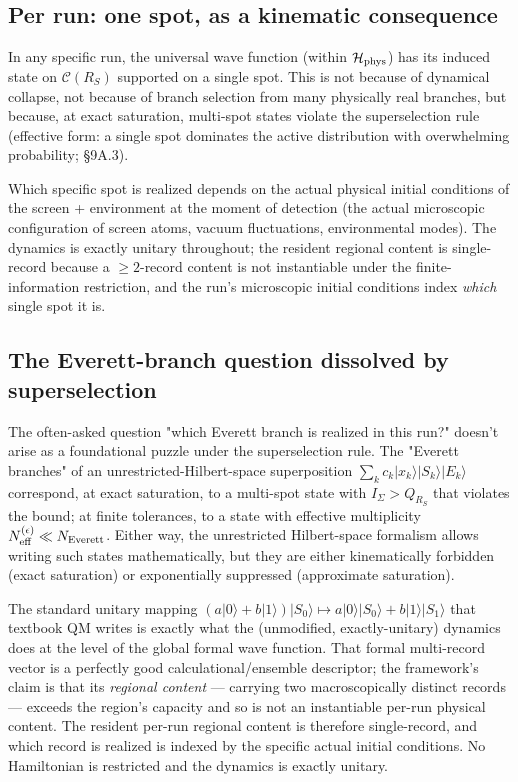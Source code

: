 \documentclass[11pt,a4paper]{article}
\begin{document}
\subsection{Per run: one spot, as a kinematic consequence}

In any specific run, the universal wave function (within $\mathcal{H}_{\rm phys}$) has its induced state on $\mathcal{C}(R_S)$ supported on a single spot. This is not because of dynamical collapse, not because of branch selection from many physically real branches, but because, at exact saturation, multi-spot states violate the superselection rule (effective form: a single spot dominates the active distribution with overwhelming probability; §9A.3).

Which specific spot is realized depends on the actual physical initial conditions of the screen + environment at the moment of detection (the actual microscopic configuration of screen atoms, vacuum fluctuations, environmental modes). The dynamics is exactly unitary throughout; the resident regional content is single-record because a $\ge 2$-record content is not instantiable under the finite-information restriction, and the run's microscopic initial conditions index \emph{which} single spot it is.

\subsection{The Everett-branch question dissolved by superselection}

The often-asked question "which Everett branch is realized in this run?" doesn't arise as a foundational puzzle under the superselection rule. The "Everett branches" of an unrestricted-Hilbert-space superposition $\sum_k c_k |x_k\rangle|S_k\rangle|E_k\rangle$ correspond, at exact saturation, to a multi-spot state with $I_\Sigma > Q_{R_S}$ that violates the bound; at finite tolerances, to a state with effective multiplicity $N^{(\epsilon)}_{\rm eff} \ll N_{\rm Everett}$. Either way, the unrestricted Hilbert-space formalism allows writing such states mathematically, but they are either kinematically forbidden (exact saturation) or exponentially suppressed (approximate saturation).

The standard unitary mapping $(a|0\rangle + b|1\rangle)|S_0\rangle \mapsto a|0\rangle|S_0\rangle + b|1\rangle|S_1\rangle$ that textbook QM writes is exactly what the (unmodified, exactly-unitary) dynamics does at the level of the global formal wave function. That formal multi-record vector is a perfectly good calculational/ensemble descriptor; the framework's claim is that its \emph{regional content} — carrying two macroscopically distinct records — exceeds the region's capacity and so is not an instantiable per-run physical content. The resident per-run regional content is therefore single-record, and which record is realized is indexed by the specific actual initial conditions. No Hamiltonian is restricted and the dynamics is exactly unitary.
\end{document}
